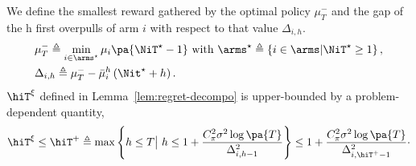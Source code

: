 \begin{lemma}\label{lem:UB-OP-PD}
We define the smallest reward gathered by the optimal policy $\mu^-_T$ and the gap of the h first overpulls of arm $i$ with respect to that value $\Delta_{i,h}$.
\begin{align*}
&\mu^-_T\triangleq \min_{i \in \arms^\star} \mu_i \pa{\NiT^\star -1} \text{ with }\arms^\star \triangleq\left\{ i \in \arms | \NiT^\star \geq 1 \right\}, \\
&\Delta_{i,h} \triangleq \mu^-_T- \bar{\mu}_i^h\left( \Nit^\star+h \right).
\end{align*}
$\hiT^\xi$ defined in Lemma~\ref{lem:regret-decompo} is upper-bounded by a problem-dependent quantity,
\begin{equation*}
\hiT^\xi \leq   \hiT^+  \triangleq \max \left\{ h \leq T \big| \ h \leq  1 + \frac{C_\pi^2 \sigma^2 \log \pa{T}}{\Delta_{i,h-1}^2} \right\}  \leq  1 + \frac{C_\pi^2 \sigma^2 \log \pa{T}}{\Delta_{i,\hiT^+-1}^2}\cdot
\end{equation*}
\end{lemma}
